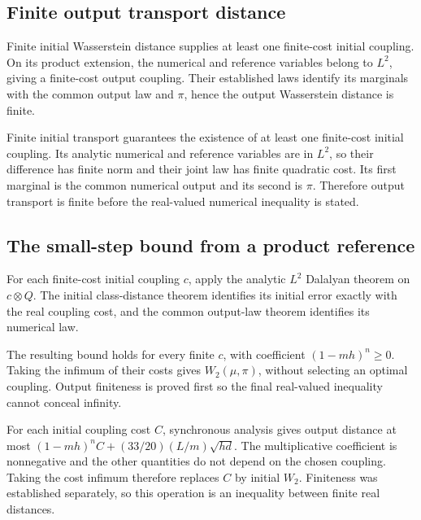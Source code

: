 \documentclass[11pt,a4paper]{article}
\begin{document}
\subsection{\texorpdfstring{Finite output transport distance}{Finite output transport distance}}


Finite initial Wasserstein distance supplies at least one finite-cost initial coupling. On its product extension, the numerical and reference variables belong to \(L^2\), giving a finite-cost output coupling. Their established laws identify its marginals with the common output law and \(\pi\), hence the output Wasserstein distance is finite.



Finite initial transport guarantees the existence of at least one finite-cost initial coupling. Its analytic numerical and reference variables are in \(L^2\), so their difference has finite norm and their joint law has finite quadratic cost. Its first marginal is the common numerical output and its second is \(\pi\). Therefore output transport is finite before the real-valued numerical inequality is stated.


\subsection{\texorpdfstring{The small-step bound from a product reference}{The small-step bound from a product reference}}


For each finite-cost initial coupling \(c\), apply the analytic \(L^2\) Dalalyan theorem on \(c\otimes Q\). The initial class-distance theorem identifies its initial error exactly with the real coupling cost, and the common output-law theorem identifies its numerical law.



The resulting bound holds for every finite \(c\), with coefficient \((1-mh)^n\ge0\). Taking the infimum of their costs gives \(W_2(\mu,\pi)\), without selecting an optimal coupling. Output finiteness is proved first so the final real-valued inequality cannot conceal infinity.



For each initial coupling cost \(C\), synchronous analysis gives output distance at most \((1-mh)^nC+(33/20)(L/m)\sqrt{hd}\). The multiplicative coefficient is nonnegative and the other quantities do not depend on the chosen coupling. Taking the cost infimum therefore replaces \(C\) by initial \(W_2\). Finiteness was established separately, so this operation is an inequality between finite real distances.
\end{document}
